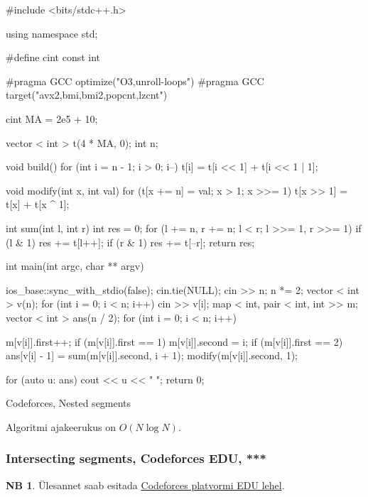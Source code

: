 \documentclass{trkut}
\theoremstyle{definition}
\newtheorem*{extra}{NB}
\begin{document}
\begin{cclol}
#include <bits/stdc++.h>

using namespace std;

#define cint
const int

#pragma GCC optimize("O3,unroll-loops")
#pragma GCC target("avx2,bmi,bmi2,popcnt,lzcnt")

cint MA = 2e5 + 10;

vector < int > t(4 * MA, 0);
int n;

void build() {
  for (int i = n - 1; i > 0; i--) t[i] = t[i << 1] + t[i << 1 | 1];
}

void modify(int x, int val) {
  for (t[x += n] = val; x > 1; x >>= 1) t[x >> 1] = t[x] + t[x ^ 1];
}

int sum(int l, int r) {
  int res = 0;
  for (l += n, r += n; l < r; l >>= 1, r >>= 1) {
    if (l & 1) res += t[l++];
    if (r & 1) res += t[--r];
  }
  return res;
}

int main(int argc, char ** argv) {
  ios_base::sync_with_stdio(false);
  cin.tie(NULL);
  cin >> n;
  n *= 2;
  vector < int > v(n);
  for (int i = 0; i < n; i++) {
    cin >> v[i];
  }
  map < int, pair < int, int >> m;
  vector < int > ans(n / 2);
  for (int i = 0; i < n; i++) {

    m[v[i]].first++;
    if (m[v[i]].first == 1) m[v[i]].second = i;
    if (m[v[i]].first == 2) {
      ans[v[i] - 1] = sum(m[v[i]].second, i + 1);
      modify(m[v[i]].second, 1);
    }
  }
  for (auto u: ans) {
    cout << u << " ";
  }
  return 0;
}
    \end{cclol}
    \begin{kk}[H]
    \caption{Codeforces, Nested segments}%
    \end{kk}
Algoritmi ajakeerukus on $O(N\log N)$.


\subsubsection{Intersecting segments, Codeforces EDU, ***}
\begin{extra}
Ülesannet saab esitada \href{https://codeforces.com/edu/course/2/lesson/4/3/practice/contest/274545/problem/D}{Codeforces platvormi EDU lehel}.
\end{extra}
\end{document}
